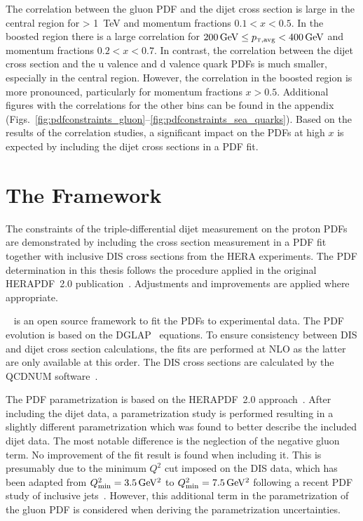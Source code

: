 The correlation between the gluon PDF and the dijet cross section is large in
the central region for \ptavg > \SI{1}{\TeV} and momentum fractions $0.1 < x <
0.5$. In the boosted region there is a large correlation for $\SI{200}{\GeV}
\leq \ptavg < \SI{400}{\GeV}$ and momentum fractions $0.2 < x < 0.7$. In
contrast, the correlation between the dijet cross section and the u valence and
d valence quark PDFs is much smaller, especially in the central region. However,
the correlation in the boosted region is more pronounced, particularly for
momentum fractions $x > 0.5$. Additional figures with the correlations
for the other bins can be found in the appendix
(Figs.~\ref{fig:pdfconstraints_gluon}--\ref{fig:pdfconstraints_sea_quarks}). Based
on the results of the correlation studies, a significant impact on the PDFs at
high $x$ is expected by including the dijet cross sections in a PDF fit.

\section{The \xfitter Framework}
\label{section:herafittersetup}

The constraints of the triple-differential dijet measurement on the proton PDFs
are demonstrated by including the cross section measurement in a PDF fit
together with inclusive DIS cross sections from the HERA experiments. The PDF
determination in this thesis follows the procedure applied in the original
HERAPDF~2.0 publication~\cite{Abramowicz:2015mha}. Adjustments and improvements
are applied where appropriate.

\xfitter~\cite{Alekhin:2014irh} is an open source framework to fit the PDFs to
experimental data. The PDF evolution is based
on the DGLAP~\cite{Gribov:1972ri,Altarelli:1977zs,Dokshitzer:1977sg} equations.
To ensure consistency between DIS and dijet cross section calculations, the fits are performed
at NLO as the latter are only available at this order. The DIS cross sections
are calculated by the QCDNUM software~\cite{Botje:2010ay}.

The PDF parametrization is based on the  HERAPDF~2.0
approach~\cite{Abramowicz:2015mha}. After including the dijet data, a
parametrization study is performed resulting in a slightly different
parametrization which was found to better describe the included dijet data. The
most notable difference is the neglection of the negative gluon term.  No
improvement of the fit result is found when including it. This is presumably due
to the minimum $Q^2$ cut imposed on the DIS data, which has been adapted from
$Q^2_\mathrm{min}=\SI{3.5}{\GeVsq}$ to $Q^2_\mathrm{min}=\SI{7.5}{\GeVsq}$
following a recent PDF study of inclusive jets~\cite{Khachatryan:2014waa}.
However, this additional term in the parametrization of the gluon PDF is
considered when deriving the parametrization uncertainties.

